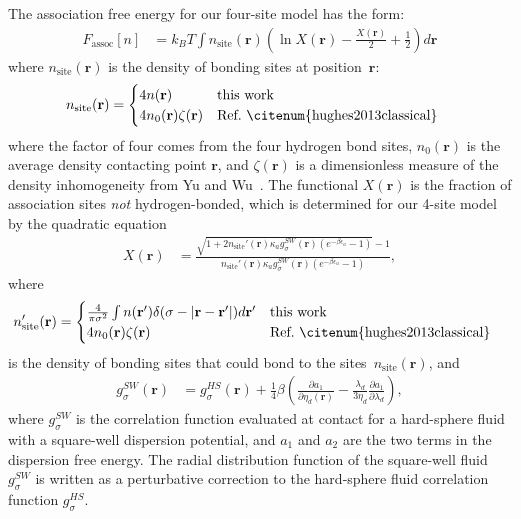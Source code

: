 \documentclass[twocolumn,amsmath,amssymb,prl]{revtex4-1}
\newcommand{\rr}{\textbf{r}}
\newcommand{\xx}{\textbf{r}}
\newcommand\etadisp{\ensuremath{\eta_\textit{d}}}
\newcommand\epsilonassoc{\ensuremath{\epsilon_\textit{a}}}
\newcommand\kappaassoc{\ensuremath{\kappa_\textit{a}}}
\newcommand\lambdadisp{\ensuremath{\lambda_\textit{d}}}
\begin{document}
The association free energy for our four-site model has the form:
\begin{align}
  F_\text{assoc}[n] &= k_BT \int n_\text{site}(\xx)
  \left(\ln X(\xx) - \frac{X(\xx)}{2} + \frac12\right) d\xx
\end{align}
where $n_\text{site}(\rr)$ is the density of bonding sites at
position~$\rr$:
\begin{align}
  n_\text{site}(\rr) &=
  \begin{cases}
    4 n(\rr) & \text{this work}\\
    4 n_0(\rr) \zeta(\rr) & \text{Ref.~\citenum{hughes2013classical}}
  \end{cases}
\end{align}
where the factor of four comes from the four hydrogen bond sites,
$n_0(\rr)$ is the average density contacting point $\rr$, and
$\zeta(\xx)$ is a dimensionless measure of the density inhomogeneity
from Yu and Wu~\cite{yu2002fmt-dft-inhomogeneous-associating}.  The
functional $X(\rr)$ is the fraction of association sites \emph{not}
hydrogen-bonded, which is determined for our 4-site model by the
quadratic equation
\begin{align}
  X(\xx) &= \frac{\sqrt{1 + 2n_\text{site}'(\rr)
      \kappaassoc g^\textit{SW}_\sigma(\xx)
  \left(e^{-\beta\epsilonassoc} - 1\right)} - 1}
  {n_\text{site}'(\rr)
    \kappaassoc g^\textit{SW}_\sigma(\xx)
  \left(e^{-\beta\epsilonassoc} - 1\right)}, \label{eq:X}
\end{align}
where
\begin{align}
  n_\text{site}'(\rr) &=
  \begin{cases}
    \frac{4}{\pi\sigma^2} \int n(\rr')\delta(\sigma - |\rr-\rr'|) d\rr' & \text{this work}\\
    4 n_0(\rr) \zeta(\rr) & \text{Ref.~\citenum{hughes2013classical}}
  \end{cases} 
\end{align}
is the density of bonding sites that could bond to the sites~$n_\text{site}(\rr)$, and
\begin{align}
  g^\textit{SW}_\sigma(\xx) &= g^\textit{HS}_\sigma(\xx) +
  \frac{1}{4}\beta\left(\frac{\partial a_1}{\partial \etadisp(\xx)} -
  \frac{\lambdadisp}{3 \etadisp}\frac{\partial a_1}{\partial \lambdadisp}\right)\label{eq:gSW},
\end{align}
where $g^\textit{SW}_\sigma$ is the correlation function evaluated at
contact for a hard-sphere fluid with a square-well dispersion
potential, and $a_1$ and $a_2$ are the two terms in the dispersion
free energy.  The radial distribution function of the square-well
fluid $g^\textit{SW}_\sigma$ is written as a perturbative correction
to the hard-sphere fluid correlation function $g^\textit{HS}_\sigma$.
\end{document}
